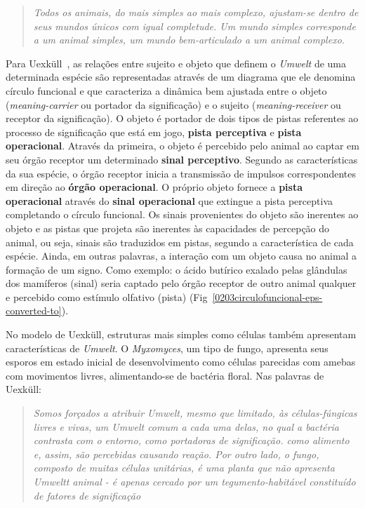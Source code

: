 \begin{quote}\textit{Todos os animais, do mais simples ao mais complexo, ajustam-se dentro de seus mundos únicos com igual completude. Um mundo simples corresponde a um animal simples, um mundo bem-articulado a um animal complexo.}~\cite{uexkull34} \end{quote}

Para Uexküll~\cite{uexkull34, uexkull82}, as relações entre sujeito e objeto que definem o \textit{Umwelt} de uma determinada espécie são representadas através de um diagrama que ele denomina círculo funcional e que caracteriza a dinâmica bem ajustada entre o objeto (\textit{meaning-carrier} ou portador da significação) e o sujeito (\textit{meaning-receiver} ou receptor da significação). O objeto é portador de dois tipos de pistas referentes ao processo de significação que está em jogo, \textbf{pista perceptiva} e \textbf{pista operacional}. Através da primeira, o objeto é percebido pelo  animal ao captar em seu órgão receptor um determinado \textbf{sinal perceptivo}. Segundo as características da sua espécie, o órgão receptor inicia a transmissão de impulsos correspondentes em direção ao \textbf{órgão operacional}. O próprio objeto fornece a \textbf{pista operacional} através do \textbf{sinal operacional} que extingue a pista perceptiva completando o círculo funcional. Os sinais provenientes do objeto são inerentes ao objeto e as pistas que projeta são inerentes às capacidades de percepção do animal, ou seja, sinais são traduzidos em pistas, segundo a característica de cada espécie. Ainda, em outras palavras, a interação com um objeto causa no animal a formação de um signo. Como exemplo: o ácido butírico exalado pelas glândulas dos mamíferos (sinal) seria captado pelo órgão receptor  de outro animal qualquer e percebido como estímulo olfativo (pista) (Fig~\ref{0203circulofuncional-eps-converted-to}).


No modelo de Uexküll, estruturas mais simples como células também apresentam características de \textit{Umwelt}. O \textit{Myxomyces}, um tipo de fungo, apresenta seus esporos em estado inicial de desenvolvimento como células parecidas com amebas com movimentos livres, alimentando-se de bactéria floral. Nas palavras de Uexküll:

\begin{quote}\textit{Somos forçados a atribuir \textit{Umwelt}, mesmo que limitado, às células-fúngicas livres e vivas, um \textit{Umwelt} comum a cada uma delas, no qual a bactéria  contrasta com o entorno, como portadoras de significação. como alimento e, assim, são percebidas causando reação. Por outro lado, o fungo, composto de muitas células unitárias, é uma planta que não apresenta \textit{Umwelt}t animal - é apenas cercado por um tegumento-habitável constituído de fatores de significação}~\cite{uexkull34} \end{quote}

